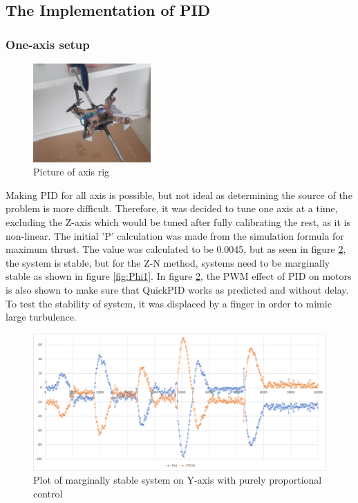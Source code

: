 \subsection{The Implementation of PID}
\subsubsection{One-axis setup}
\begin{figure}
    \centering
    \includegraphics[width=0.4\textwidth]{pictures/Axis_rig.jpg}
    \caption{Picture of axis rig}
    \label{fig:axis_rig}
\end{figure}
Making PID for all axis is possible, but not ideal as determining the source of the problem is more difficult. Therefore, it was decided to tune one axis at a time, excluding the Z-axis which would be tuned after fully calibrating the rest, as it is non-linear.
The initial 'P' calculation was made from the simulation formula for maximum thrust. The value was calculated to be 0.0045, but as seen in figure \ref{fig:Phi0}, the system is stable, but for the Z-N method, systems need to be marginally stable as shown in figure \ref{fig:Phi1}. 
In figure \ref{fig:Phi0}, the PWM effect of PID on motors is also shown to make sure that QuickPID works as predicted and without delay.
To test the stability of system, it was displaced by a finger in order to mimic large turbulence.

\begin{figure}[h!]
    \centering
    \includegraphics[width=\textwidth]{pictures/graphs/PhiP00045.png}
    \caption{Plot of marginally stable system on Y-axis with purely proportional control}
    \label{fig:Phi0}
\end{figure}

